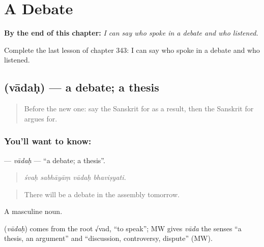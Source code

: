 
\chapter{A Debate}
\label{ch:sa-a-debate}

\begin{chapteropening}
\textbf{By the end of this chapter:} \emph{I can say who spoke in a debate and who listened.}

Complete the last lesson of chapter 343: I can say who spoke in a debate and who listened.
\end{chapteropening}

\section[\texorpdfstring{\sk{वादः} (vādaḥ)}{वादः (vādaḥ)}]{ (vādaḥ) — a debate; a thesis}

\label{lesson:SA-C343-vadah}



\begin{quote}
Before the new one: say the Sanskrit for as a result, then the Sanskrit for argues for.
\end{quote}

\subsection*{You'll want to know: }
\textbf{} — \emph{vādaḥ} — \textquotedblleft{}a debate; a thesis\textquotedblright{}.

\begin{quote}
   
\end{quote}

\begin{quote}
\emph{śvaḥ sabhāyāṃ vādaḥ bhaviṣyati.}
\end{quote}

\begin{quote}
There will be a debate in the assembly tomorrow.
\end{quote}

A masculine noun.

\begin{cousinweb}
\textbf{} (\emph{vādaḥ}) comes from the root √vad, \textquotedblleft{}to speak\textquotedblright{}; MW gives \emph{vāda} the senses \textquotedblleft{}a thesis, an argument\textquotedblright{} and \textquotedblleft{}discussion, controversy, dispute\textquotedblright{} (MW).
\end{cousinweb}

